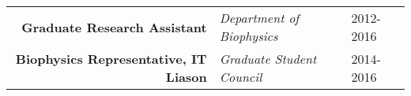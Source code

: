\begin{minipage}{\textwidth}
\begin{center}
\begin{itemize}
	\end{itemize}
    \end{center}
\end{minipage}


\begin{minipage}{\textwidth}
	\begin{center}
		\begin{tabular}{rll}
			\textbf{Graduate Research Assistant} & \textit{Department of Biophysics} & 2012-2016\none \\
			\textbf{Biophysics Representative, IT Liason} & \textit{Graduate Student Council} & 2014-2016\ntwo \\
		\end{tabular}
	\end{center}
\end{minipage}

